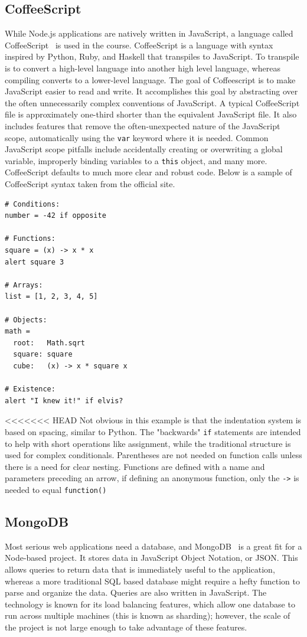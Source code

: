 \documentclass[12pt]{article}
\newcommand{\code}[1]{{\texttt {#1}}}
\begin{document}
\subsection{CoffeeScript}\label{sec:coffee}
While Node.js applications are natively written in JavaScript, a language called CoffeeScript~\cite{CoffeeScript} is used in the course. CoffeeScript is a language with syntax inspired by Python, Ruby, and Haskell that transpiles to JavaScript. To transpile is to convert a high-level language into another high level language, whereas compiling converts to a lower-level language. The goal of Coffeescript is to make JavaScript easier to read and write. It accomplishes this goal by abstracting over the often unnecessarily complex conventions of JavaScript. A typical CoffeeScript file is approximately one-third shorter than the equivalent JavaScript file. It also includes features that remove the often-unexpected nature of the JavaScript scope, automatically using the \code{var} keyword where it is needed. Common JavaScript scope pitfalls include accidentally creating or overwriting a global variable, improperly binding variables to a \code{this} object, and many more. CoffeeScript defaults to much more clear and robust code. Below is a sample of CoffeeScript syntax taken from the official site.
\begin{verbatim}
# Conditions:
number = -42 if opposite

# Functions:
square = (x) -> x * x
alert square 3

# Arrays:
list = [1, 2, 3, 4, 5]

# Objects:
math =
  root:   Math.sqrt
  square: square
  cube:   (x) -> x * square x

# Existence:
alert "I knew it!" if elvis?

\end{verbatim}
<<<<<<< HEAD
Not obvious in this example is that the indentation system is based on spacing, similar to Python. The "backwards" \code{if} statements are intended to help with short operations like assignment, while the traditional structure is used for complex conditionals. Parentheses are not needed on function calls unless there is a need for clear nesting. Functions are defined with a name and parameters preceding an arrow, if defining an anonymous function, only the \code{->} is needed to equal \code{function()}


\subsection{MongoDB}\label{sec:mongo}
Most serious web applications need a database, and MongoDB~\cite{MongoDB} is a great fit for a Node-based project. It stores data in JavaScript Object Notation, or JSON. This allows queries to return data that is immediately useful to the application, whereas a more traditional SQL based database might require a hefty function to parse and organize the data. Queries are also written in JavaScript. The technology is known for its  load balancing features, which allow one database to run across multiple machines (this is known as sharding); however, the scale of the project is not large enough to take advantage of these features.
\end{document}
